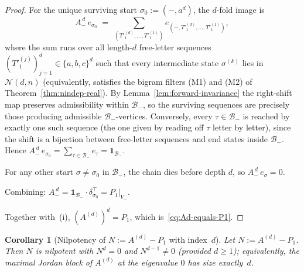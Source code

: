 \documentclass{amsart}
\newtheorem{corollary}[theorem]{Corollary}
\theoremstyle{definition}
\theoremstyle{remark}
\begin{document}
\begin{proof}
For the unique surviving start $\sigma_0 := (-, a^d)$, the
$d$-fold image is
\[
  A_-^{\,d} \, e_{\sigma_0}
  \;=\; \sum_{(T'^{(d)}_1, \ldots, T'^{(1)}_1)}
        e_{(-, T'^{(d)}_1, \ldots, T'^{(1)}_1)},
\]
where the sum runs over all length-$d$ free-letter sequences
$(T'^{(j)}_1)_{j=1}^d \in \{a, b, c\}^d$ such that every
intermediate state $\sigma^{(k)}$ lies in $\mathcal{N}(d, n)$
(equivalently, satisfies the bigram filters (M1) and (M2) of
Theorem~\ref{thm:nindep-real}).  By Lemma~\ref{lem:forward-invariance}
the right-shift map preserves admissibility within $\mathcal{B}_-$,
so the surviving sequences are precisely those producing
admissible $\mathcal{B}_-$-vertices.  Conversely, every
$\tau \in \mathcal{B}_-$ is reached by exactly one such sequence
(the one given by reading off $\tau$ letter by letter), since the
shift is a bijection between free-letter sequences and end states
inside $\mathcal{B}_-$.  Hence
$A_-^{\,d}\,e_{\sigma_0} = \sum_{\tau \in \mathcal{B}_-} e_\tau
= \mathbf{1}_{\mathcal{B}_-}$.

For any other start $\sigma \neq \sigma_0$ in $\mathcal{B}_-$,
the chain dies before depth $d$, so $A_-^{\,d}\,e_\sigma = 0$.

Combining: $A_-^{\,d} = \mathbf{1}_{\mathcal{B}_-} \cdot
\delta_{\sigma_0}^\top = P_1|_{V_-}$.

Together with~(i), $(A^{(d)})^d = P_1$, which is~\eqref{eq:Ad-equals-P1}.
\end{proof}

\begin{corollary}[Nilpotency of $N := A^{(d)} - P_1$ with index~$d$]
\label{cor:N-nilpotent}
Let $N := A^{(d)} - P_1$.  Then $N$ is nilpotent with
$N^d = 0$ and $N^{d-1} \neq 0$ (provided $d \ge 1$); equivalently,
the maximal Jordan block of $A^{(d)}$ at the eigenvalue $0$ has
size exactly~$d$.
\end{corollary}
\end{document}
